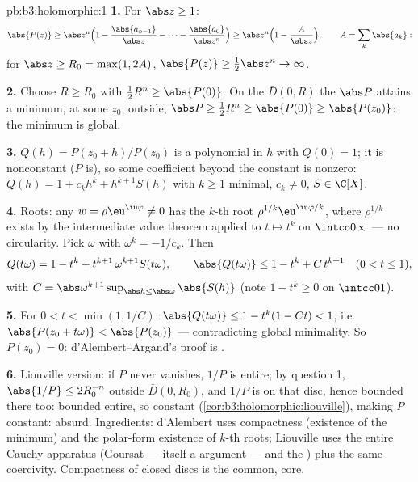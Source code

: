 \begin{solution}{pb:b3:holomorphic:1}
\textbf{1.} For $\abs z \geq 1$:
\[
\abs{P(z)} \geq \abs z^n\Bigl(1 -
\frac{\abs{a_{n-1}}}{\abs z} - \dots -
\frac{\abs{a_0}}{\abs z^n}\Bigr)
\geq \abs z^n\Bigl(1 - \frac{A}{\abs z}\Bigr),
\qquad A = \sum_k\abs{a_k} :
\]
for $\abs z \geq R_0 = \max(1, 2A)$, $\abs{P(z)} \geq
\frac12\abs z^n \to \infty$.

\textbf{2.} Choose $R \geq R_0$ with $\frac12R^n \geq
\abs{P(0)}$. On the  $\bar D(0, R)$ the 
$\abs P$ attains a minimum, at some $z_0$; outside, $\abs P
\geq \frac12R^n \geq \abs{P(0)} \geq \abs{P(z_0)}$: the
minimum is global.

\textbf{3.} $Q(h) = P(z_0 + h)/P(z_0)$ is a polynomial in $h$
with $Q(0) = 1$; it is nonconstant ($P$ is), so some
coefficient beyond the constant is nonzero: $Q(h) = 1 +
c_kh^k + h^{k+1}S(h)$ with $k \geq 1$ minimal, $c_k \neq 0$,
$S \in \C[X]$.

\textbf{4.} Roots: any $w = \rho\eu^{\iu\varphi} \neq 0$ has
the $k$-th root $\rho^{1/k}\eu^{\iu\varphi/k}$, where
$\rho^{1/k}$ exists by the intermediate value theorem applied
to $t \mapsto t^k$ on $\intco0\infty$ --- no circularity.
Pick $\omega$ with $\omega^k = -1/c_k$. Then
\[
Q(t\omega) = 1 - t^k + t^{k+1}\,\omega^{k+1}S(t\omega),
\qquad
\abs{Q(t\omega)} \leq 1 - t^k + C\,t^{k+1}
\quad (0 < t \leq 1),
\]
with $C = \abs\omega^{k+1}\sup_{\abs h \leq
\abs\omega}\abs{S(h)}$ (note $1 - t^k \geq 0$ on $\intcc01$).

\textbf{5.} For $0 < t < \min(1, 1/C)$: $\abs{Q(t\omega)}
\leq 1 - t^k(1 - Ct) < 1$, i.e.\ $\abs{P(z_0 + t\omega)} <
\abs{P(z_0)}$ --- contradicting global minimality. So
$P(z_0) = 0$: d'Alembert--Argand's proof is .

\textbf{6.} Liouville version: if $P$ never vanishes, $1/P$
is entire; by question 1, $\abs{1/P} \leq 2R_0^{-n}$ outside
$\bar D(0, R_0)$, and $1/P$ is  on that 
disc, hence bounded there too: bounded entire, so constant
(\cref{cor:b3:holomorphic:liouville}), making $P$ constant:
absurd. Ingredients: d'Alembert uses compactness (existence
of the minimum) and the polar-form existence of $k$-th roots;
Liouville uses the entire Cauchy apparatus (Goursat ---
itself a  argument --- and the ) plus the same coercivity. Compactness of closed
discs is the common,  core.


\end{solution}
